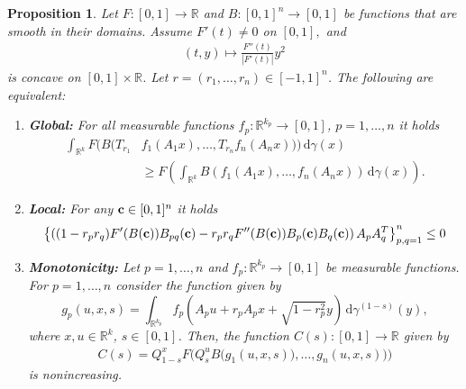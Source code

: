 \documentclass[9pt, a4paper]{amsart}
\newcommand{\R}{\mathbb{R}}
\newcommand{\1}{{\chi_{}}}%
\newtheorem{proposition}{Proposition}
\numberwithin{equation}{section}
\begin{document}
	
	\begin{proposition}\label{MFstatement}
		 Let $F : [0,1] \to \mathbb{R}$ and $ B : [0,1]^n \to [0,1] $ be functions that are smooth in their domains. Assume  $F'(t)\neq 0$ on $[0,1],$ and
\begin{align}\label{lemmaConvF1}
(t,y) \mapsto \frac{F''(t)}{|F'(t)|}y^{2}
\end{align}
is concave on $[0,1]\times \mathbb{R}$. Let $r=(r_1,\ldots,r_n)\in[-1,1]^n$. The following are equivalent:
	\vspace{0.2cm}
		\begin{enumerate}
			\item \label{Global} \textbf{Global:} For all measurable functions $f_p:\R^{k_p}\to[0,1]$, $p=1,\ldots,n$  it holds
			\vspace{0.2cm}
			\begin{align}\label{FBreal}
				\int_{\R^k}F \Big(B(T_{r_1}&f_1(A_1 x), \ldots, T_{r_n}f_n( A_n x))\Big) \,\mathrm{d}\gamma(x)\\
				&\nonumber\geq F\left(	\int_{\R^k}B(f_1(A_1 x), \ldots, f_n(A_n x))\,\mathrm{d}\gamma(x)\right).
			\end{align}  
			\vspace{0.2cm}
			\item \label{Local}\textbf{Local:} For any ${\bf{c}}\in[0,1]^n$ it holds
			\vspace{0.2cm}
\begin{align}\label{posDefi}
\left\{\left((1-r_pr_q)F'(B({\bf{c}}))B_{pq}({\bf{c}})-r_pr_qF''(B({\bf{c}}))B_{p}({\bf{c}})B_{q}({\bf{c}}) \right)A_pA_q^T \right\}_{p,q=1}^n\leq0
\end{align}
\vspace{0.2cm}
\item \label{monotonicity} \textbf{Monotonicity:} Let $p=1,\ldots,n$ and  $f_p:\R^{k_p}\to[0,1]$ be measurable functions. For $p=1,\ldots,n$ consider the function given by 
\begin{equation}\label{gforMeasurebla}
g_p(u,x,s)=\int_{\mathbb{R}^{k_p}} f_p(A_p u + r_p A_p x + \sqrt{1 - r_p^2} y) \, \mathrm{d}\gamma^{(1-s)}(y),
\end{equation}
where $x,u\in\R^k$, $s\in[0,1]$. Then,  the function $C(s):[0,1]\to \R$ given by  
\vspace{0.2cm}
\begin{align}\label{CinRealcase}
C(s)=Q_{1-s}^x F\big(Q_s^uB\big(g_1(u,x,s)\big),\ldots,g_n(u,x,s))\big)
\end{align}
\vspace{0.2cm}
is nonincreasing.
\end{enumerate} 
\end{proposition}
\end{document}
